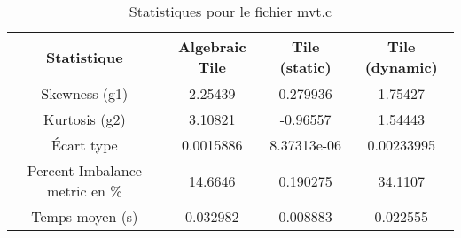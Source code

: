 \documentclass{article}
\begin{document}
\begin{table}[htbp]
  \centering
  \caption{Statistiques pour le fichier mvt.c}
  \begin{tabular}{|c|c|c|c|}
    \hline
    Statistique & Algebraic Tile & Tile (static) & Tile (dynamic) \\ 
    \hline
    Skewness (g1) & 2.25439 & 0.279936 & 1.75427 \\ 
    Kurtosis (g2) & 3.10821 & -0.96557 & 1.54443 \\ 
    Écart type & 0.0015886 & 8.37313e-06 & 0.00233995\\ 
    Percent Imbalance metric en \% & 14.6646 & 0.190275 & 34.1107\\ 
    Temps moyen (s) & 0.032982 & 0.008883 & 0.022555 \\ 
    \hline
  \end{tabular}
\end{table}
\newpage
\end{document}
